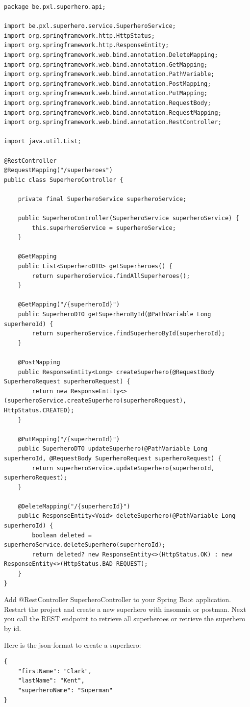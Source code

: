 \begin{lstlisting}[frame=single]
package be.pxl.superhero.api;

import be.pxl.superhero.service.SuperheroService;
import org.springframework.http.HttpStatus;
import org.springframework.http.ResponseEntity;
import org.springframework.web.bind.annotation.DeleteMapping;
import org.springframework.web.bind.annotation.GetMapping;
import org.springframework.web.bind.annotation.PathVariable;
import org.springframework.web.bind.annotation.PostMapping;
import org.springframework.web.bind.annotation.PutMapping;
import org.springframework.web.bind.annotation.RequestBody;
import org.springframework.web.bind.annotation.RequestMapping;
import org.springframework.web.bind.annotation.RestController;

import java.util.List;

@RestController
@RequestMapping("/superheroes")
public class SuperheroController {

	private final SuperheroService superheroService;

	public SuperheroController(SuperheroService superheroService) {
		this.superheroService = superheroService;
	}

	@GetMapping
	public List<SuperheroDTO> getSuperheroes() {
		return superheroService.findAllSuperheroes();
	}

	@GetMapping("/{superheroId}")
	public SuperheroDTO getSuperheroById(@PathVariable Long superheroId) {
		return superheroService.findSuperheroById(superheroId);
	}
	
	@PostMapping
	public ResponseEntity<Long> createSuperhero(@RequestBody SuperheroRequest superheroRequest) {
		return new ResponseEntity<>(superheroService.createSuperhero(superheroRequest), HttpStatus.CREATED);
	}
	
	@PutMapping("/{superheroId}")
	public SuperheroDTO updateSuperhero(@PathVariable Long superheroId, @RequestBody SuperheroRequest superheroRequest) {
		return superheroService.updateSuperhero(superheroId, superheroRequest);
	}
	
	@DeleteMapping("/{superheroId}")
	public ResponseEntity<Void> deleteSuperhero(@PathVariable Long superheroId) {
		boolean deleted = superheroService.deleteSuperhero(superheroId);
		return deleted? new ResponseEntity<>(HttpStatus.OK) : new ResponseEntity<>(HttpStatus.BAD_REQUEST);
	}
}
\end{lstlisting}

\begin{oefening}
Add @RestController SuperheroController to your Spring Boot application.  Restart the project and create a new superhero with insomnia or postman.  Next you call the REST endpoint to retrieve all superheroes or retrieve the superhero by id. 

Here is the json-format to create a superhero:
\begin{lstlisting}
{
	"firstName": "Clark",
	"lastName": "Kent",
	"superheroName": "Superman"
}
\end{lstlisting}
\end{oefening}

